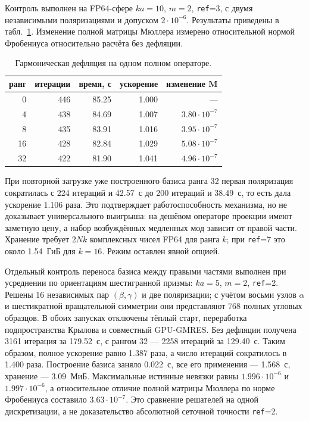 \documentclass[12pt,a4paper]{article}
\begin{document}
Контроль выполнен на FP64-сфере $ka=10$, $m=2$, \texttt{ref}=3, с двумя
независимыми поляризациями и допуском $2\cdot10^{-6}$. Результаты приведены в
табл.~\ref{tab:ritz-deflation}. Изменение полной матрицы Мюллера измерено
относительной нормой Фробениуса относительно расчёта без дефляции.

\begin{table}[H]
\centering
\caption{Гармоническая дефляция на одном полном операторе.}
\label{tab:ritz-deflation}
\begin{tabular}{rrrrr}
\toprule
ранг & итерации & время, с & ускорение & изменение $\mathbf M$\\
\midrule
0  & 446 & 85.25 & 1.000 & ---\\
4  & 438 & 84.69 & 1.007 & $3.80\cdot10^{-7}$\\
8  & 435 & 83.91 & 1.016 & $3.95\cdot10^{-7}$\\
16 & 428 & 82.84 & 1.029 & $5.08\cdot10^{-7}$\\
32 & 422 & 81.90 & 1.041 & $4.96\cdot10^{-7}$\\
\bottomrule
\end{tabular}
\end{table}

При повторной загрузке уже построенного базиса ранга 32 первая поляризация
сократилась с 224 итераций и 42.57~с до 200 итераций и 38.49~с, то есть дала
ускорение 1.106 раза. Это подтверждает работоспособность механизма, но не
доказывает универсального выигрыша: на дешёвом операторе проекции имеют
заметную цену, а набор возбуждённых медленных мод зависит от правой части.
Хранение требует $2Nk$ комплексных чисел FP64 для ранга $k$; при
\texttt{ref}=7 это около 1.54~ГиБ для $k=16$. Режим оставлен явной опцией.

Отдельный контроль переноса базиса между правыми частями выполнен при
усреднении по ориентациям шестигранной призмы: $ka=5$, $m=2$,
\texttt{ref}=2. Решены 16 независимых пар $(\beta,\gamma)$ и две поляризации;
с учётом восьми узлов $\alpha$ и шестикратной вращательной симметрии они
представляют 768 полных угловых образцов. В обоих запусках отключены
тёплый старт, переработка подпространства Крылова и совместный GPU-GMRES.
Без дефляции получена 3161 итерация за 179.52~с, с рангом 32 --- 2258
итераций за 129.40~с. Таким образом, полное ускорение равно 1.387 раза,
а число итераций сократилось в 1.400 раза. Построение базиса заняло 0.022~с,
все его применения --- 1.568~с, хранение --- 3.09~МиБ. Максимальные истинные
невязки равны $1.996\cdot10^{-6}$ и $1.997\cdot10^{-6}$, а относительное отличие полной
матрицы Мюллера по норме Фробениуса составило $3.63\cdot10^{-7}$. Это сравнение
решателей на одной дискретизации, а не доказательство абсолютной сеточной точности
\texttt{ref}=2.
\end{document}

